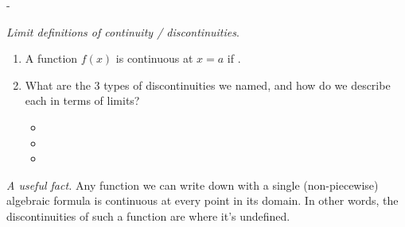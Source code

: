 \documentclass{article}
\makeatletter
\newlength{\tipmargin}
\renewenvironment{framed}{
  \setlength{\tipmargin}{\textwidth-\linewidth}
  \advance\@totalleftmargin-\tipmargin
  \def\FrameCommand{\hspace{\tipmargin}\fbox}%
  \advance\linewidth\tipmargin
  \MakeFramed {\advance\hsize-\width \FrameRestore}%
}
{\endMakeFramed}
\makeatother
\begin{document}
\begin{framed}
  \emph{Limit definitions of continuity / discontinuities}.
  \begin{enumerate}
  \item A function $f(x)$ is continuous at $x = a$ if 
  .
  \item What are the 3 types of discontinuities we named, and how do we describe each in terms of limits?
    \begin{itemize}[topsep=0pt]
    \item \medskip {}
    \item \medskip {}
    \item \medskip {}
    \end{itemize}    
  \end{enumerate}

  \emph{A useful fact.} Any function we can write down with a single (non-piecewise) algebraic formula is continuous at every point in its domain. In other words, the discontinuities of such a function are where it's undefined.
\end{framed}
\end{document}
